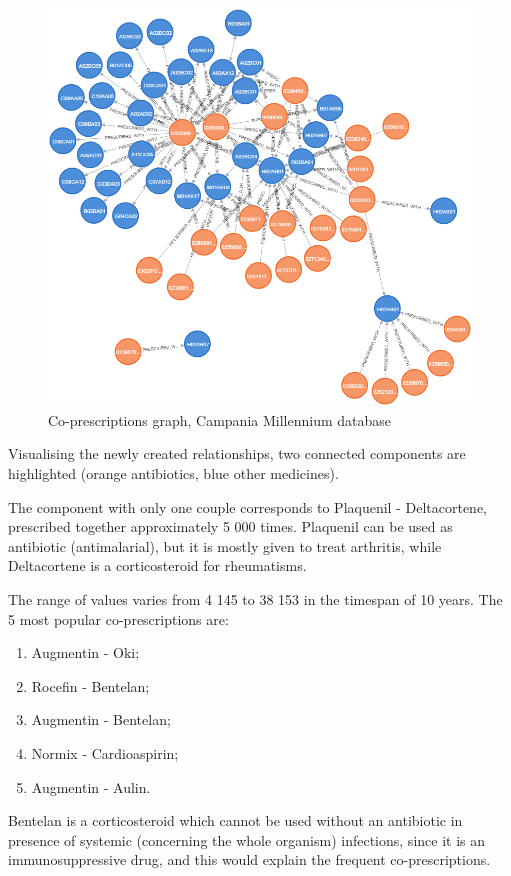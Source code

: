 \begin{figure}[h]
	\centering
	\includegraphics[scale=0.3]{./images/couples-graph.png}
	\caption{\small Co-prescriptions graph, Campania Millennium database}
\end{figure}

Visualising the newly created relationships, two connected components are highlighted (orange antibiotics, blue other medicines).

The component with only one couple corresponds to Plaquenil - Deltacortene, prescribed together approximately 5 000 times. Plaquenil can be used as antibiotic (antimalarial), but it is mostly given to treat arthritis, while Deltacortene is a corticosteroid for rheumatisms. 

The range of values varies from 4 145 to 38 153 in the timespan of 10 years. The 5 most popular co-prescriptions are:
\begin{enumerate}
	\item Augmentin - Oki;
	\item Rocefin - Bentelan;
	\item Augmentin - Bentelan;
	\item Normix - Cardioaspirin;
	\item Augmentin - Aulin.
\end{enumerate}

Bentelan is a corticosteroid which cannot be used without an antibiotic in presence of systemic (concerning the whole organism) infections\cite{bentelan}, since it is an immunosuppressive drug, and this would explain the frequent co-prescriptions.

